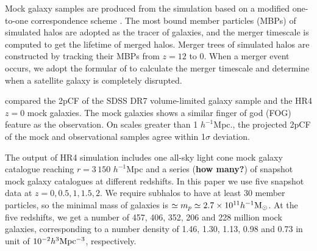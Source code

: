 \documentclass[iop]{emulateapj}
\newcommand{\hMsun}{{\ifmmode{h^{-1}{\rm
        {M_{\odot}}}}\else{$h^{-1}{\rm{M_{\odot}}}$~}\fi}}
\begin{document}
Mock galaxy samples are produced from the simulation based on a modified one-to-one correspondence scheme \citep{hong2016}. 
The most bound member particles (MBPs) of simulated halos are adopted as the tracer of galaxies,
and the merger timescale is computed to get the lifetime of merged halos.
Merger trees of simulated halos are constructed by tracking their MBPs from $z = 12$ to 0.
When a merger event occurs, we adopt the formular of \cite{jiang2008} to calculate the merger timescale 
and determine when a satellite galaxy is completely disrupted.

\cite{hong2016} compared the 2pCF of the SDSS DR7 volume-limited galaxy sample \citep{zehavi2011} and the HR4 $z=0$ mock galaxies.
The mock galaxies shows a similar finger of god (FOG) feature \citep{FOG} as the observation.
On scales greater than 1 ${h^{-1}}$Mpc., 
the projected 2pCF of the mock and observational samples agree within 1$\sigma$ deviation.

The output of HR4 simulation includes one all-sky light cone mock galaxy catalogue reaching $r=3\,150$ ${h^{-1}}$Mpc 
and a series ({\bf how many?}) of snapshot mock galaxy catalogues at different redshifts.
In this paper we use five snapshot data at $z=0,0.5,1,1.5,2$.
We require subhalos to have at least 30 member particles, 
so the minimal mass of galaxies is $\simeq m_{p} \simeq 2.7 \times 10^{11} \hMsun$.
At the five redshifts, we get a number of
457, 406, 352, 206 and 228 million mock galaxies,
corresponding to a number density of 
1.46, 1.30, 1.13, 0.98 and 0.73 in unit of $ 10^{-2} h^{3} \rm Mpc^{-3}$,
respectively.
\end{document}
